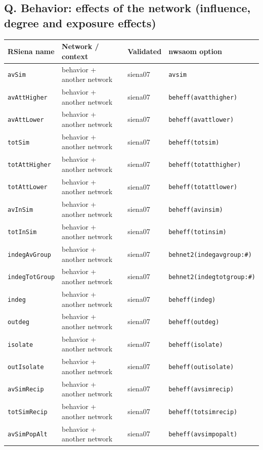 \subsection*{Q. Behavior: effects of the network (influence, degree and exposure effects)}
\footnotesize
\begin{longtable}{@{}p{2.6cm}p{3.2cm}p{2.9cm}p{5.4cm}@{}}
\toprule
RSiena name & Network / context & Validated & nwsaom option\\
\midrule
\endhead
\texttt{avSim} & behavior + another network & siena07 & \texttt{avsim}\\
\texttt{avAttHigher} & behavior + another network & siena07 & \texttt{beheff(avatthigher)}\\
\texttt{avAttLower} & behavior + another network & siena07 & \texttt{beheff(avattlower)}\\
\texttt{totSim} & behavior + another network & siena07 & \texttt{beheff(totsim)}\\
\texttt{totAttHigher} & behavior + another network & siena07 & \texttt{beheff(totatthigher)}\\
\texttt{totAttLower} & behavior + another network & siena07 & \texttt{beheff(totattlower)}\\
\texttt{avInSim} & behavior + another network & siena07 & \texttt{beheff(avinsim)}\\
\texttt{totInSim} & behavior + another network & siena07 & \texttt{beheff(totinsim)}\\
\texttt{indegAvGroup} & behavior + another network & siena07 & \texttt{behnet2(indegavgroup:\#)}\\
\texttt{indegTotGroup} & behavior + another network & siena07 & \texttt{behnet2(indegtotgroup:\#)}\\
\texttt{indeg} & behavior + another network & siena07 & \texttt{beheff(indeg)}\\
\texttt{outdeg} & behavior + another network & siena07 & \texttt{beheff(outdeg)}\\
\texttt{isolate} & behavior + another network & siena07 & \texttt{beheff(isolate)}\\
\texttt{outIsolate} & behavior + another network & siena07 & \texttt{beheff(outisolate)}\\
\texttt{avSimRecip} & behavior + another network & siena07 & \texttt{beheff(avsimrecip)}\\
\texttt{totSimRecip} & behavior + another network & siena07 & \texttt{beheff(totsimrecip)}\\
\texttt{avSimPopAlt} & behavior + another network & siena07 & \texttt{beheff(avsimpopalt)}\\

\end{longtable}
